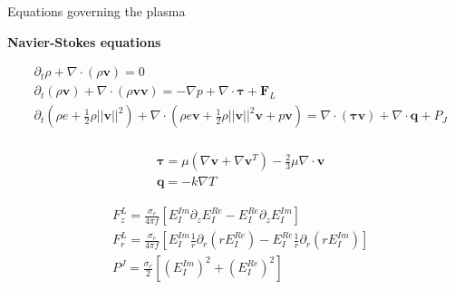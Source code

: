\documentclass[24pt,t,table, aspectratio=169]{beamer}
\newcommand{\vecF}{\mathbf{F}}
\newcommand{\vecq}{\mathbf{q}}
\newcommand{\vectau}{\boldsymbol{\tau}}
\newcommand{\vecv}{\mathbf{v}}
\begin{document}
\begin{frame}{Equations governing the plasma}

\textbf{Navier-Stokes equations}

\begin{framed}
\begin{equation*}
\begin{aligned}
& \partial_t \rho + \nabla \cdot \left(\rho \vecv\right) = 0\\
& \partial_t \left(\rho \vecv\right) + \nabla \cdot \left(\rho \vecv \vecv \right) = -\nabla p + \nabla \cdot \vectau + \vecF_L\\
& \partial_t \left(\rho e + \frac{1}{2} \rho ||\vecv||^2\right) + \nabla \cdot \left(\rho e \vecv + \frac{1}{2} \rho ||\vecv||^2 \vecv + p \vecv\right) = \nabla \cdot \left(\vectau\vecv\right) + \nabla \cdot \vecq + P_J\\
\end{aligned}
\end{equation*}
\end{framed}

{
\vspace{-.7cm}
\begin{minipage}{0.49\linewidth}
\begin{equation*}
\begin{aligned}
& \vectau = \mu \left(\nabla \vecv + \nabla \vecv^T\right) - \frac{2}{3} \mu \nabla \cdot \vecv\\
& \vecq = -k \nabla T
\end{aligned}
\end{equation*}
\end{minipage}
\begin{minipage}{0.49\linewidth}
\begin{equation*}
\begin{aligned}
& F_z^L = \frac{\sigma_e}{4 \pi f} \left[E_I^{Im} \partial_z E_I^{Re} - E_I^{Re} \partial_z E_I^{Im}\right]\\
& F_r^L = \frac{\sigma_e}{4 \pi f} \left[E_I^{Im} \frac{1}{r}\partial_r (r E_I^{Re}) - E_I^{Re} \frac{1}{r} \partial_r (r E_I^{Im})\right]\\
& P^J = \frac{\sigma_e}{2} \left[(E_I^{Im})^2 + (E_I^{Re})^2\right]
\end{aligned}
\end{equation*}
\end{minipage}
}

\end{frame}
\end{document}
